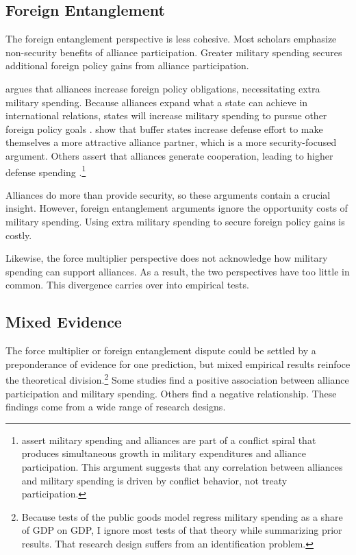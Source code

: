 \documentclass[12pt]{article}
\begin{document}
\subsection{Foreign Entanglement}


The foreign entanglement perspective is less cohesive.
Most scholars emphasize non-security benefits of alliance participation. 
Greater military spending secures additional foreign policy gains from alliance participation. 


\citet{Diehl1994} argues that alliances increase foreign policy obligations, necessitating extra military spending. 
Because alliances expand what a state can achieve in international relations, states will increase military spending to pursue other foreign policy goals \citep{MorganPalmer2006}. 
\citet{Horowitzetal2017} show that buffer states increase defense effort to make themselves a more attractive alliance partner, which is a more security-focused argument. 
Others assert that alliances generate cooperation, leading to higher defense spending \citep{Palmer1990, QuirozFlores2011}.\footnote{
\citet{SeneseVasquez2008} assert military spending and alliances are part of a conflict spiral that produces simultaneous growth in military expenditures and alliance participation. 
This argument suggests that any correlation between alliances and military spending is driven by conflict behavior, not treaty participation.
}


Alliances do more than provide security, so these arguments contain a crucial insight.
However, foreign entanglement arguments ignore the opportunity costs of military spending. 
Using extra military spending to secure foreign policy gains is costly.

 
Likewise, the force multiplier perspective does not acknowledge how military spending can support alliances. 
As a result, the two perspectives have too little in common. 
This divergence carries over into empirical tests. 


\subsection{Mixed Evidence} 


The force multiplier or foreign entanglement dispute could be settled by a preponderance of evidence for one prediction, but mixed empirical results reinfoce the theoretical division.\footnote{
Because tests of the public goods model regress military spending as a share of GDP on GDP, I ignore most tests of that theory while summarizing prior results. That research design suffers from an identification problem.}
Some studies find a positive association between alliance participation and military spending. 
Others find a negative relationship. 
These findings come from a wide range of research designs. 
\end{document}
